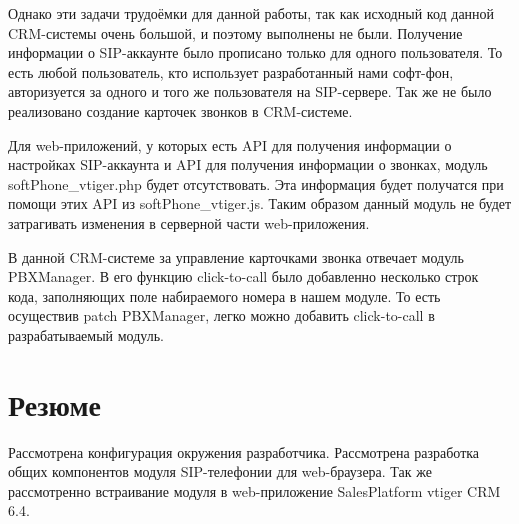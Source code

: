 Однако эти задачи трудоёмки для данной работы, так как исходный код данной CRM-системы очень большой, и поэтому выполнены не были. Получение информации о SIP-аккаунте было прописано только для одного пользователя. То есть любой пользователь, кто использует разработанный нами софт-фон, авторизуется за одного и того же пользователя на SIP-сервере. Так же не было реализовано создание карточек звонков в CRM-системе.

Для web-приложений, у которых есть API для получения информации о настройках SIP-аккаунта и API для получения информации о звонках, модуль softPhone\_vtiger.php будет отсутствовать. Эта информация будет получатся при помощи этих API из softPhone\_vtiger.js. Таким образом данный модуль не будет затрагивать изменения в серверной части web-приложения.

В данной CRM-системе за управление карточками звонка отвечает модуль PBXManager. В его функцию click-to-call было добавленно несколько строк кода, заполняющих поле набираемого номера в нашем модуле. То есть осуществив patch PBXManager, легко можно добавить click-to-call в разрабатываемый модуль.

\section{Резюме}

Рассмотрена конфигурация окружения разработчика. Рассмотрена разработка общих компонентов модуля SIP-телефонии для web-браузера. Так же рассмотренно встраивание модуля в web-приложение SalesPlatform vtiger CRM 6.4.
